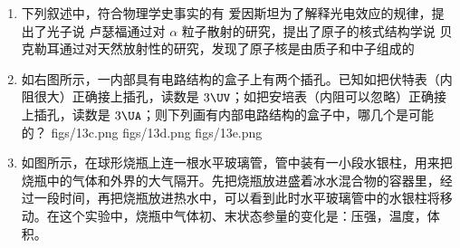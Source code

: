 \documentclass[\gkver]{gaokaozhenti}
\begin{document}
\begin{enumerate}

\item
下列叙述中，符合物理学史事实的有
{爱因斯坦为了解释光电效应的规律，提出了光子说}
{卢瑟福通过对 $\alpha$ 粒子散射的研究，提出了原子的核式结构学说}
{贝克勒耳通过对天然放射性的研究，发现了原子核是由质子和中子组成的}


\item
如右图所示，一内部具有电路结构的盒子上有两个插孔。已知如把伏特表（内阻很大）正确接上插孔，读数是 $3\UV$；如把安培表（内阻可以忽略）正确接上插孔，读数是 $3\UA$；则下列画有内部电路结构的盒子中，哪几个是可能的？
\onepicture[align=right, w=4.31cm]{}
{figs/13c.png}
{figs/13d.png}
{figs/13e.png}


\item
如图所示，在球形烧瓶上连一根水平玻璃管，管中装有一小段水银柱，用来把烧瓶中的气体和外界的大气隔开。先把烧瓶放进盛着冰水混合物的容器里，经过一段时间，再把烧瓶放进热水中，可以看到此时水平玻璃管中的水银柱将移动。在这个实验中，烧瓶中气体初、末状态参量的变化是：压强，温度，体积。
\onepicture[align=right, w=4.20cm]{}




\end{enumerate}
\end{document}
